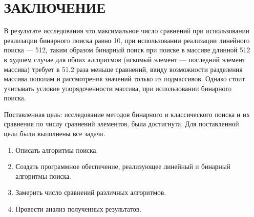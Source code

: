 \chapter*{\hfill{\centering  ЗАКЛЮЧЕНИЕ}\hfill}

В результате исследования что максимальное число сравнений при использовании реализации бинарного поиска равно 10, при использовании реализации линейного поиска --- 512, таким образом бинарный поиск при поиске в массиве длинной 512 в худшем случае для обоих алгоритмов (искомый элемент --- последний элемент массива) требует в 51.2 раза меньше сравнений, ввиду возможности разделения массива пополам и рассмотрения значений только из подмассивов. Однако стоит учитывать условие упорядоченности массива, при использовании бинарного поиска.


Поставленная цель: исследование методов бинарного и классического поиска и их сравнения по числу сравнений элементов, была достигнута.
Для поставленной цели были выполнены все задачи.
\begin{enumerate}
	\item Описать алгоритмы поиска.
	\item Создать программное обеспечение, реализующее линейный и бинарный алгоритмы поиска.
	\item Замерить число сравнений различных алгоритмов.
	\item Провести анализ полученных результатов.
\end{enumerate}
